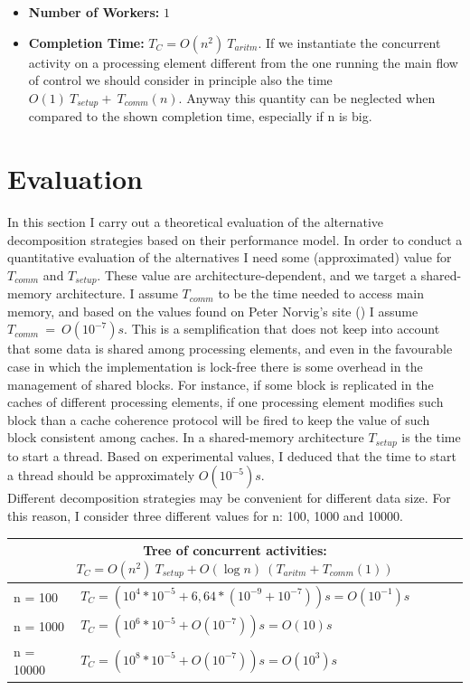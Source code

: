 \documentclass{article}
\begin{document}
\begin{itemize}
\item \textbf{Number of Workers:} $1$
\item \textbf{Completion Time:} $T_{C} = O(n^{2}) \: T_{aritm}$. If we instantiate the concurrent activity on a processing element different from the one running the main flow of control we should consider in principle also the time $O(1) \: T_{setup} + \: T_{comm}(n)$. Anyway this quantity can be neglected when compared to the shown completion time, especially if n is big.
\end{itemize}

\section{Evaluation}
In this section I carry out a theoretical evaluation of the alternative decomposition strategies based on their performance model. In order to conduct a quantitative evaluation of the alternatives I need some (approximated) value for $T_{comm}$ and $T_{setup}$. These value are architecture-dependent, and we target a shared-memory architecture. I assume $T_{comm}$ to be the time needed to access main memory, and based on the values found on Peter Norvig's site (\cite{access_time}) I assume $T_{comm} \: = \: O(10^{-7})s$. This is a semplification that does not keep into account that some data is shared among processing elements, and even in the favourable case in which the implementation is lock-free there is some overhead in the management of shared blocks. For instance, if some block is replicated in the caches of different processing elements, if one processing element modifies such block than a cache coherence protocol will be fired to keep the value of such block consistent among caches. In a shared-memory architecture $T_{setup}$ is the time to start a thread. Based on experimental values, I deduced that the time to start a thread should be approximately $O(10^{-5})s$. \\
Different decomposition strategies may be convenient for different data size. For this reason, I consider three different values for n: 100, 1000 and 10000.     

\hskip1.60cm
\renewcommand{\arraystretch}{2}
\begin{tabular}[c]{ |l|l| }
  \hline 
  \multicolumn{2}{|c|}{\textbf{Tree of concurrent activities}: $ T_C = O(n^2) \: T_{setup} + O( \log n) \: (T_{aritm} + T_{comm}(1) )$ } \\[10pt]
  \hline
  n = 100 & $T_C = (10^4 * 10^{-5} + 6,64 * (10^{-9} + 10^{-7}))s = O(10^{-1})s$ \\
   \hline
  n = 1000 & $T_C = (10^6 * 10^{-5} + O(10^{-7}))s = O(10)s$  \\
  \hline
  n = 10000 & $T_C = (10^8 * 10^{-5} + O(10^{-7}))s = O(10^3)s$ \\
  \hline 
\end{tabular} \\[15pt]
\end{document}
